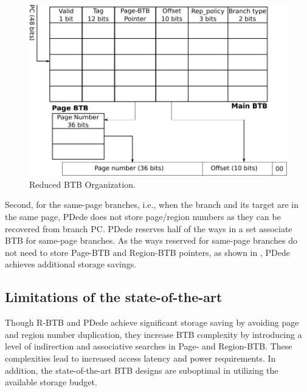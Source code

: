 \begin{figure}
\centering
\includegraphics[width=.9\columnwidth, trim=0 0 0 0, clip]{figures/fig_9a_no_pcshift.pdf}
\caption{Reduced BTB Organization.}
\label{hpca:fig:rbtb}
\end{figure}

Second, for the same-page branches, i.e., when the branch and its target are in the same page, PDede does not store page/region numbers as they can be recovered from branch PC. PDede reserves half of the ways in a set associate BTB for same-page branches. As the ways reserved for same-page branches do not need to store Page-BTB and Region-BTB pointers, as shown in , PDede achieves additional storage savings.

\subsection{Limitations of the state-of-the-art} Though R-BTB and PDede achieve significant storage saving by avoiding page and region number duplication, they increase BTB complexity by introducing a level of indirection and associative searches in Page- and Region-BTB. These complexities lead to increased access latency and power requirements. In addition, the state-of-the-art BTB designs are suboptimal in utilizing the available storage budget.


